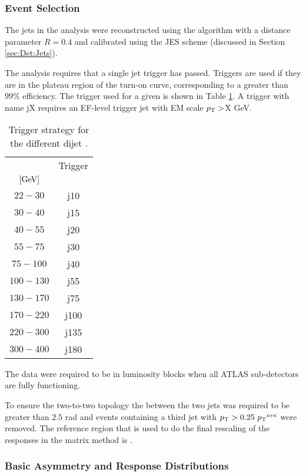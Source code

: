 \subsubsection{Event Selection}

The jets in the analysis were reconstructed using the \antikt{} algorithm with a distance parameter $R=0.4$ and calibrated using the JES scheme (discussed in Section \ref{sec:Det:Jets}).

The analysis requires that a single jet trigger has passed.
Triggers are used if they are in the plateau region of the turn-on curve, corresponding to a greater than $99\%$ efficiency.
The trigger used for a given \ptave{} is shown in Table \ref{JetPerf:Triggers}.
A trigger with name jX requires an EF-level trigger jet with EM scale $\mbox{$p_{\rm T}$}{}>$X GeV.
\begin{table}
\centering
\begin{tabular}{  c c }
\ptave{} & Trigger\\
$[\rm GeV]$ & \\
\hline
$22-30$   & j10 \\
$30-40$   & j15 \\
$40-55$   & j20 \\
$55-75$   & j30 \\
$75-100$  & j40 \\
$100-130$ & j55 \\
$130-170$ & j75 \\
$170-220$ & j100 \\
$220-300$ & j135 \\
$300-400$ & j180 \\
\end{tabular}
\caption[Trigger strategy for dijet \pt{} balance in 2011]{
Trigger strategy for the different dijet \ptave{}. 
\label{JetPerf:Triggers}}
\end{table}
The data were required to be in luminosity blocks when all ATLAS sub-detectors are fully functioning. 

To ensure the two-to-two topology the \dphi{} between the two jets was required to be greater than $2.5$ rad and events containing a third jet with $\mbox{$p_{\rm T}$}{} >0.25~ \mbox{$\mbox{$p_{\rm T}$}{}^{ave}$}{}$ were removed.
The reference region that is used to do the final rescaling of the responses in the matrix method is .

\subsubsection{Basic Asymmetry and Response Distributions}

